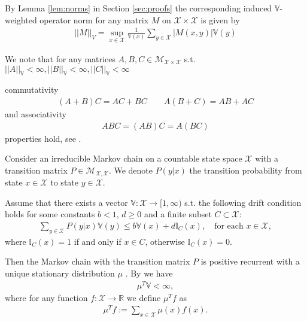 \documentclass[11pt]{article}
\newcommand{\R}{\mathbb{R}}
\newcommand{\I}{\mathbb{I}}
\newcommand{\X}{\mathcal{X}}
\newcommand{\M}{\mathcal{M}}
\newcommand{\F}{\mathcal{F}}
\newcommand{\V}{\mathbb{V}}
\theoremstyle{definition}
\numberwithin{equation}{section}
\begin{document}
By Lemma \ref{lem:norms}  in Section \ref{sec:proofs} the corresponding induced $\V$-weighted operator norm for any matrix $M$ on $\X\times \X$ is given by
 \begin{align*}
 ||M||_V = \sup\limits_{x\in \X} \frac{1}{\V(x)}\sum\limits_{y\in \X}|M(x, y)| \V(y)
\end{align*}

We note that for any matrices $A, B, C \in \M_{\X\times \X}$ s.t. $||A||_\V<\infty, ||B||_\V<\infty, ||C||_\V<\infty$

commutativity
\begin{align*}
(A+B)C = AC +BC\quad \quad A(B +C)= AB +AC
\end{align*}
and associativity 
\begin{align*}
ABC =(AB)C= A(BC)
\end{align*}
properties hold, see \cite[Proposition 2.1, Lemma 2.1]{Jiang2017}.


Consider an irreducible Markov chain on a countable state space $\X$ with a transition matrix $P\in   \M_{\X, \X}$. We denote $P(y|x)$ the transition probability from state $x\in \X$ to state $y\in \X$. 

Assume that there exists a vector $\V:\X\rightarrow [1, \infty)$ s.t. the following drift condition holds for some constants  $b<1$, $d\geq0$ and a finite subset $C\subset \X$:
\begin{align}\label{eq:drift}
\sum\limits_{y\in \X}P(y|x)\V(y)\leq b \V(x) +d\I_{C}(x), \quad \text{for each }x\in \X,
\end{align}
where $\I_{C}(x)=1$ if and only if $x\in C$, otherwise $\I_{C}(x)=0$.

Then the Markov chain with the transition matrix  $P$ is positive recurrent with a unique stationary distribution   $\mu$ \cite[Theorem 11.3.4]{Meyn2009}. 
By \cite[Theorem 14.3.7]{Meyn2009} we have \begin{align*}\mu^T\V <\infty, \end{align*}
where  for any function $f: \X \rightarrow \R$  we define $\mu^T f$ as
\begin{align*}
\mu^Tf:=\sum\limits_{x\in \X} \mu(x)f(x).
\end{align*}
\end{document}
